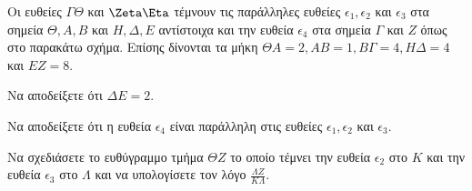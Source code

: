 Οι ευθείες $\Gamma\Theta$ και $\Zeta\Eta$ τέμνουν τις παράλληλες ευθείες $\epsilon_1, \epsilon_2$ και $\epsilon_3$ στα σημεία $\Theta, A, B$ και $H, \Delta, E$ αντίστοιχα και την ευθεία $\epsilon_4$ στα σημεία $\Gamma$ και $Z$ όπως στο παρακάτω σχήμα.
Επίσης δίνονται τα μήκη $\Theta A = 2, AB = 1, B\Gamma = 4, H\Delta = 4$ και $EZ = 8$.
\begin{alist}
\item Να αποδείξετε ότι $\Delta E = 2$. 
\item Να αποδείξετε ότι η ευθεία $\epsilon_4$ είναι παράλληλη στις ευθείες $\epsilon_1, \epsilon_2$ και $\epsilon_3$. 
\item Να σχεδιάσετε το ευθύγραμμο τμήμα $\Theta Z$ το οποίο τέμνει την ευθεία $\epsilon_2$ στο $K$ και την ευθεία $\epsilon_3$ στο $\Lambda$ και να υπολογίσετε τον λόγο $\frac{\Lambda Z}{K\Lambda}$. 
\end{alist}